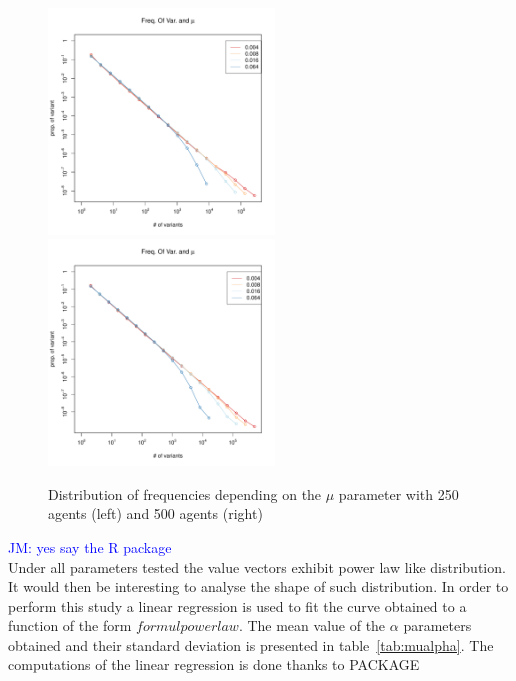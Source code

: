 \documentclass{wscpaperproc}
\newcommand{\memo}[2]{\textcolor{#1}{#2}}
\newcommand{\jm}[1]{\memo{blue}{JM: #1\\}}
\begin{document}
\begin{figure}[!hbp]
	\begin{center}
		\includegraphics[width=6cm]{img/allmuRandMaxN250.pdf}
		\includegraphics[width=6cm]{img/allmuRandMaxN500.pdf}
	\end{center}
	\caption{Distribution of frequencies depending on the $\mu$ parameter with 250 agents (left) and 500 agents (right)}
	\label{fig:allMutation }
\end{figure}

\jm{yes say the R package}
Under all parameters tested the value vectors exhibit power law like distribution. It would then be interesting to analyse the shape of such distribution. In order to perform this study a linear regression is used to fit the curve obtained to a function of the form $formul powerlaw$. The mean value of the $\alpha$ parameters obtained and their standard deviation is presented in table~\ref{tab:mualpha}. The computations of the linear regression is done thanks to PACKAGE
\end{document}
